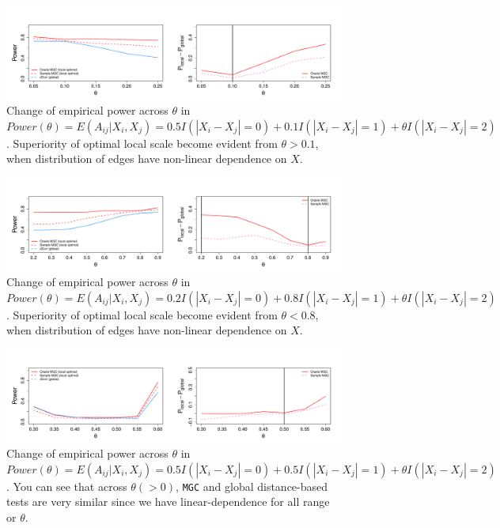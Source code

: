 \documentclass[12pt]{article}
\theoremstyle{definition}
\begin{document}
\begin{figure}[H]
	\centering
	\includegraphics[width=6in]{../Figure/powerplot_mmono.pdf}
	\caption{Change of empirical power across $\theta$ in $Power(\theta) = E(A_{ij} | X_{i}, X_{j}) = 0.5 I(|X_{i} - X_{j}| = 0) + 0.1 I(|X_{i} - X_{j}| = 1) + \theta I(|X_{i} - X_{j}| = 2)$. Superiority of optimal local scale become evident from $\theta > 0.1$, when distribution of edges have non-linear dependence on $X$.}
	\label{fig:powerplot_mmono}
\end{figure}

\begin{figure}[H]
	\centering
	\includegraphics[width=6in]{../Figure/powerplot_mmmono.pdf}
	\caption{Change of empirical power across $\theta$ in $Power(\theta) = E(A_{ij} | X_{i}, X_{j}) = 0.2 I(|X_{i} - X_{j}| = 0) + 0.8 I(|X_{i} - X_{j}| = 1) + \theta I(|X_{i} - X_{j}| = 2)$. Superiority of optimal local scale become evident from $\theta < 0.8$, when distribution of edges have non-linear dependence on $X$.}
	\label{fig:powerplot_mmmono}
\end{figure}

\begin{figure}[H]
	\centering
	\includegraphics[width=6in]{../Figure/powerplot_monoton.pdf}
	\caption{Change of empirical power across $\theta$ in $Power(\theta) = E(A_{ij} | X_{i}, X_{j}) = 0.5 I(|X_{i} - X_{j}| = 0) + 0.5 I(|X_{i} - X_{j}| = 1) + \theta I(|X_{i} - X_{j}| = 2)$. You can see that across $\theta (>0)$, \texttt{MGC} and global distance-based tests are very similar since we have linear-dependence for all range or $\theta$.}
	\label{fig:powerplot_monoton}
\end{figure}
\end{document}
